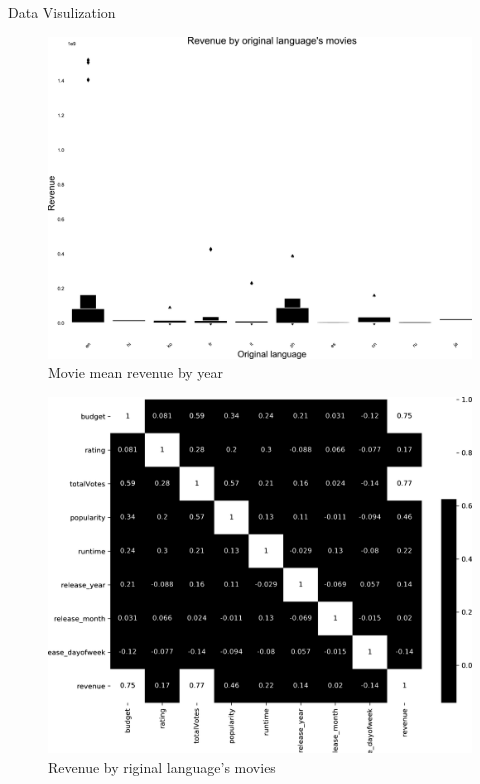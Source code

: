 \documentclass[
 size=12pt,
 paper=smartboard, %
 mode=present, %
 display=slides, %
style=tuliplab,
pauseslide,
fleqn,leqno]{powerdot}
\begin{document}
\begin{slide}{ Data Visulization}
    \begin{figure}[ht]%
	\centering%
	\includegraphics[scale=0.05]{logos/5.eps}
	\caption{Movie mean revenue by year}%
    \end{figure}

    \begin{figure}[ht]%
	\centering%
	\includegraphics[scale=0.05]{logos/6.eps}
	\caption{Revenue by riginal language's movies}%
    \end{figure}
	

	
\end{slide}
\end{document}
